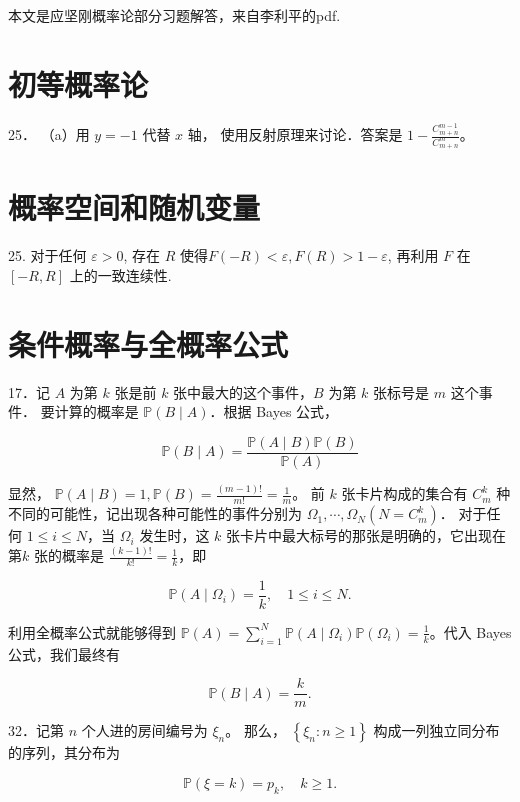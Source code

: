 本文是应坚刚概率论部分习题解答，来自李利平的pdf.

\section{初等概率论}

25．
（a）用  $y=-1$ 代替 $x$ 轴，
使用反射原理来讨论．答案是 $1-\frac{C_{m+n}^{m-1}}{C_{m+n}^{m}}$。

\section{概率空间和随机变量}

25. 对于任何 $ε>0$, 存在 $R$ 使得$F(−R)<\varepsilon,F(R) > 1−\varepsilon$, 
再利用 $F$ 在 $[−R,R]$ 上的一致连续性.

\section{条件概率与全概率公式}
17．记 $A$ 为第 $k$ 张是前 $k$ 张中最大的这个事件，$B$ 为第 $k$ 张标号是 $m$ 这个事件．
要计算的概率是 $ \mathbb{P}(B \mid A)$．根据 Bayes 公式，

$$\mathbb{P}(B \mid A)=\frac{\mathbb{P}(A \mid B) \mathbb{P}(B)}{\mathbb{P}(A)}$$

显然，  $\mathbb{P}(A \mid B)=1, \mathbb{P}(B)=\frac{(m-1)!}{m!}=\frac{1}{m} $。
前  $k$  张卡片构成的集合有  $C_{m}^{k} $ 种不同的可能性，记出现各种可能性的事件分别为 $ \Omega_{1}, \cdots, \Omega_{N}\left(N=C_{m}^{k}\right) $．
对于任何  $1 \leq i \leq N $，当 $\Omega_{i}$ 发生时，这 $k$ 张卡片中最大标号的那张是明确的，它出现在第$  k $ 张的概率是 $ \frac{(k-1)!}{k!}=\frac{1}{k} $，即

$$\mathbb{P}\left(A \mid \Omega_{i}\right)=\frac{1}{k}, \quad 1 \leq i \leq N.$$

利用全概率公式就能够得到  $\mathbb{P}(A)=\sum_{i=1}^{N} \mathbb{P}(A \mid \Omega_{i}) \mathbb{P}(\Omega_{i})=\frac{1}{k}  $。代入 Bayes 公式，我们最终有

\[\mathbb{P}(B \mid A)=\frac{k}{m}.\]

32．记第 $n$ 个人进的房间编号为 $ \xi_{n}$。
那么， $\left\{\xi_{n}: n \geq 1\right\} $ 构成一列独立同分布的序列，其分布为

\[\mathbb{P}(\xi=k)=p_{k}, \quad k \geq 1.\]

